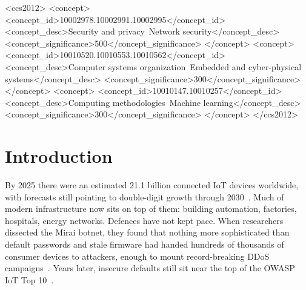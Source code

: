 \documentclass[sigconf,review,anonymous]{acmart}
\begin{document}
\begin{CCSXML}
<ccs2012>
<concept>
<concept_id>10002978.10002991.10002995</concept_id>
<concept_desc>Security and privacy~Network security</concept_desc>
<concept_significance>500</concept_significance>
</concept>
<concept>
<concept_id>10010520.10010553.10010562</concept_id>
<concept_desc>Computer systems organization~Embedded and cyber-physical systems</concept_desc>
<concept_significance>300</concept_significance>
</concept>
<concept>
<concept_id>10010147.10010257</concept_id>
<concept_desc>Computing methodologies~Machine learning</concept_desc>
<concept_significance>300</concept_significance>
</concept>
</ccs2012>
\end{CCSXML}


\maketitle

\section{Introduction}
\label{sec:introduction}

By 2025 there were an estimated 21.1 billion connected IoT devices worldwide, with forecasts still pointing to double-digit growth through 2030~\cite{iotanalytics2025}. Much of modern infrastructure now sits on top of them: building automation, factories, hospitals, energy networks. Defences have not kept pace. When researchers dissected the Mirai botnet, they found that nothing more sophisticated than default passwords and stale firmware had handed hundreds of thousands of consumer devices to attackers, enough to mount record-breaking DDoS campaigns~\cite{antonakakis2017mirai}. Years later, insecure defaults still sit near the top of the OWASP IoT Top 10~\cite{owasp2018}.
\end{document}
